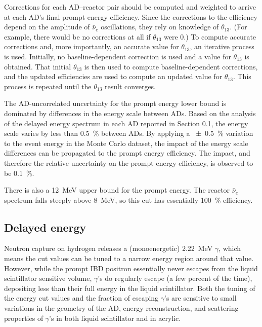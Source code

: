 \documentclass{ucbthesis}
\newcommand{\nuebar}{\ensuremath{\bar{\nu}_e}}
\newcommand{\thetaot}{\ensuremath{\theta_{13}}}
\newcommand{\mev}{\mega\electronvolt}
\begin{document}
Corrections for each AD--reactor pair should be computed
and weighted to arrive at each AD's final prompt energy efficiency.
Since the corrections to the efficiency depend on
the amplitude of \nuebar{} oscillations, they rely on knowledge of \thetaot.
(For example, there would be no corrections at all if \thetaot{} were $0$.)
To compute accurate corrections and, more importantly, an accurate value
for \thetaot{}, an iterative process is used.
Initially, no baseline-dependent correction is used and
a value for \thetaot{} is obtained.
That initial \thetaot{} is then used to compute baseline-dependent corrections,
and the updated efficiencies are used to compute an updated value for \thetaot{}.
This process is repeated until the \thetaot{} result converges.

The AD-uncorrelated uncertainty for the prompt energy lower bound
is dominated by differences in the energy scale between ADs.
Based on the analysis of the delayed energy spectrum in each AD
reported in Section \ref{subsec:delayed}, the energy scale
varies by less than \SI{0.5}{\percent} between ADs.
By applying a \SI{+-0.5}{\percent} variation to
the event energy in the Monte Carlo dataset,
the impact of the energy scale differences can be propagated
to the prompt energy efficiency.
The impact, and therefore the relative uncertainty on
the prompt energy efficiency, is observed to be \SI{0.1}{\percent}.

There is also a \SI{12}{\mega\electronvolt} upper bound for the prompt energy.
The reactor \nuebar{} spectrum falls steeply above \SI{8}{\mev},
so this cut has essentially \SI{100}{\percent} efficiency.

\subsection{Delayed energy}
\label{subsec:delayed}

Neutron capture on hydrogen releases a (monoenergetic)
\SI{2.22}{\mev} $\gamma$,
which means the cut values can be tuned to a narrow energy region
around that value.
However, while the prompt IBD positron essentially never escapes
from the liquid scintillator sensitive volume,
$\gamma$'s do regularly escape (a few percent of the time),
depositing less than their full energy in the liquid scintillator.
Both the tuning of the energy cut values
and the fraction of escaping $\gamma$'s are sensitive to
small variations in the geometry of the AD, energy reconstruction,
and scattering properties of $\gamma$'s in
both liquid scintillator and in acrylic.
\end{document}
